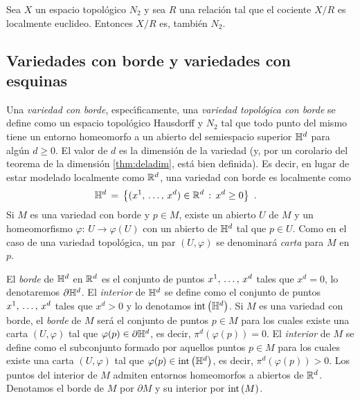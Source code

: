 \begin{lemaCocienteLocEuc}\label{thm:cocienteloceuc}
	Sea $X$ un espacio topol\'{o}gico $N_{2}$ y sea $R$ una relaci\'{o}n
	tal que el cociente $X/R$ es localmente euclideo. Entonces $X/R$
	es, tambi\'{e}n $N_{2}$.
\end{lemaCocienteLocEuc}

\subsection{Variedades con borde y variedades con esquinas}
Una \emph{variedad con borde}, espec\'{\i}ficamente, una \emph{variedad %
topol\'{o}gica con borde} se define como un espacio topol\'{o}gico
Hausdorff y $N_{2}$ tal que todo punto del mismo tiene un entorno homeomorfo
a un abierto del semiespacio superior $\mathbb{H}^{d}$ para alg\'{u}n $d\geq 0$.
El valor de $d$ es la dimensi\'{o}n de la variedad (y, por un corolario del
teorema de la dimensi\'{o}n \ref{thm:deladim}, est\'{a} bien definida).
Es decir, en lugar de estar modelado localmente como $\mathbb{R}^{d}$, una
variedad con borde es localmente como
\begin{align*}
	\bb{H}^{d} & \,=\,\left\lbrace (\lista*{x}{d})\in\bb{R}^{d}\,:\,
				x^{d}\geq 0\right\rbrace
	\text{ .}
\end{align*}
%
Si $M$ es una variedad con borde y $p\in M$, existe un abierto $U$ de $M$
y un homeomorfismo $\varphi:\,U\rightarrow\varphi(U)$ con un abierto de
$\mathbb{H}^{d}$ tal que $p\in U$. Como en el caso de una variedad topol\'{o}gica,
un par $(U,\varphi)$ se denominar\'{a} \emph{carta} para $M$ en $p$.

El \emph{borde} de $\mathbb{H}^{d}$ en $\mathbb{R}^{d}$ es el conjunto de puntos
$\lista*{x}{d}$ tales que $x^{d}=0$, lo denotaremos $\partial\mathbb{H}^{d}$.
El \emph{interior} de $\mathbb{H}^{d}$ se define como el conjunto de puntos
$\lista*{x}{d}$ tales que $x^{d}>0$ y lo denotamos $\mathrm{int}\left(\mathbb{H}^{d}\right)$.
Si $M$ es una variedad con borde, el \emph{borde} de $M$ ser\'{a} el
conjunto de puntos $p\in M$ para los cuales existe una carta $(U,\varphi)$
tal que $\varphi(p)\in\partial\mathbb{H}^{d}$, es decir, $\pi^{d}(\varphi(p))=0$.
El \emph{interior} de $M$ se define como el subconjunto formado por aquellos
puntos $p\in M$ para los cuales existe una carta $(U,\varphi)$ tal que
$\varphi(p)\in\mathrm{int}\left(\mathbb{H}^{d}\right)$, es decir, $\pi^{d}(\varphi(p))>0$.
Los puntos del interior de $M$ admiten entornos homeomorfos a abiertos de
$\mathbb{R}^{d}$. Denotamos el borde de $M$ por $\partial M$ y su interior por
$\mathrm{int}\left(M\right)$.

